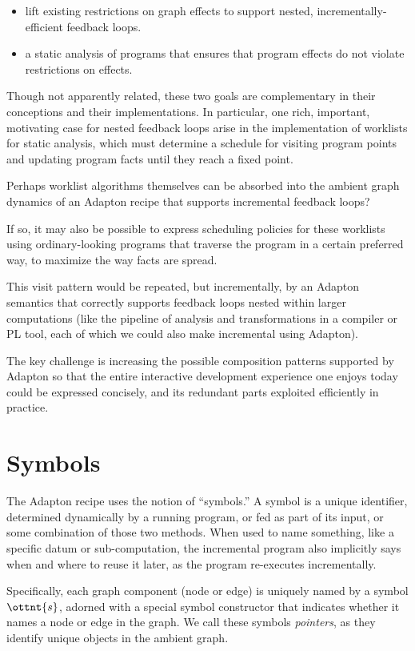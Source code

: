 \documentclass[11pt]{article}
\begin{document}
\begin{itemize}
\item lift existing restrictions on graph effects to support nested, incrementally-efficient feedback loops.
\item a static analysis of programs that ensures that program effects do not violate restrictions on effects.
\end{itemize}

Though not apparently related, these two goals are complementary in
their conceptions and their implementations.
%
In particular, one rich, important, motivating case for nested
feedback loops arise in the implementation of worklists for static
analysis, which must determine a schedule for visiting program points
and updating program facts until they reach a fixed point.

Perhaps worklist algorithms themselves can be absorbed into the
ambient graph dynamics of an Adapton recipe that supports incremental
feedback loops?

If so, it may also be possible to express scheduling policies for
these worklists using ordinary-looking programs that traverse the
program in a certain preferred way, to maximize the way facts are
spread.

This visit pattern would be repeated, but incrementally, by an Adapton
semantics that correctly supports feedback loops nested within larger
computations (like the pipeline of analysis and transformations in a
compiler or PL tool, each of which we could also make incremental
using Adapton).

The key challenge is increasing the possible composition patterns
supported by Adapton so that the entire interactive development
experience one enjoys today could be expressed concisely, and its
redundant parts exploited efficiently in practice.

\section{Symbols}

The Adapton recipe uses the notion of ``symbols.'' A symbol is a
unique identifier, determined dynamically by a running program, or fed
as part of its input, or some combination of those two methods.
%
When used to name something, like a specific datum or sub-computation,
the incremental program also implicitly says when and where to reuse
it later, as the program re-executes incrementally.

Specifically, each graph component (node or edge) is uniquely named
by a symbol $\ottnt{s}$, adorned with a special symbol constructor that
indicates whether it names a node or edge in the graph.
%
We call these symbols \emph{pointers}, as they identify unique objects
in the ambient graph.
\end{document}
